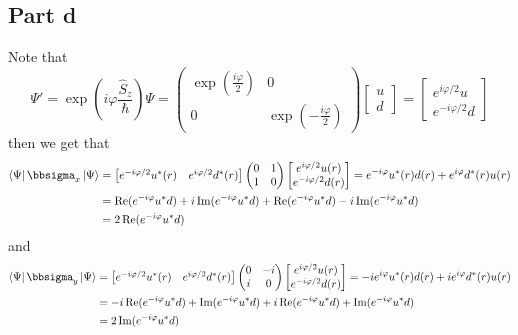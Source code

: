 \documentclass[12pt]{report}
\theoremstyle{custom}
\begin{document}
\subsection*{Part d}
Note that
\begin{equation*}
\Psi' =\exp\left(i \varphi \frac{\hat{S}_z}{\hbar}\right) \Psi =  \begin{pmatrix} \exp\left(\frac{i\varphi}{2}\right) & 0 \\ 0 & \exp\left(-\frac{i\varphi}{2}\right)\end{pmatrix} \begin{bmatrix} u \\ d\end{bmatrix} = \begin{bmatrix} e^{i\varphi/2} u \\ e^{-i\varphi/2}d \end{bmatrix} 
\end{equation*}
then we get that
\begin{align*}
  \bra{\Psi} \bbsigma_x \ket{\Psi} &= \begin{bmatrix}e^{-i\varphi/2}u^*(r) &  e^{i\varphi/2}d^*(r)\end{bmatrix} \begin{pmatrix}0 & 1 \\ 1 & 0 \end{pmatrix} \begin{bmatrix} e^{i\varphi/2}u(r) \\ e^{-i\varphi/2}d(r) \end{bmatrix} = e^{-i\varphi}u^*(r)d(r) + e^{i\varphi}d^*(r)u(r) \\
                                                                          &= \Re(e^{-i\varphi}u^*d) + i\Im(e^{-i\varphi}u^*d) + \Re(e^{-i\varphi}u^*d) - i\Im(e^{-i\varphi}u^*d) \\
                                                                      &= 2 \Re(e^{-i\varphi}u^*d)
\end{align*}
and
\begin{align*}
  \bra{\Psi} \bbsigma_y \ket{\Psi} &= \begin{bmatrix}e^{-i\varphi/2}u^*(r) &  e^{i\varphi/2}d^*(r)\end{bmatrix}\begin{pmatrix}0 & -i \\ i & 0 \end{pmatrix} \begin{bmatrix} e^{i\varphi/2}u(r) \\ e^{-i\varphi/2}d(r) \end{bmatrix} = -ie^{i\varphi}u^*(r)d(r) + i e^{i\varphi}d^*(r)u(r) \\ 
                                   &= -i\Re(e^{-i\varphi}u^*d) + \Im(e^{-i\varphi}u^*d) + i \Re(e^{-i\varphi}u^*d) + \Im(e^{-i\varphi}u^*d) \\
                                                           &= 2 \Im(e^{-i\varphi}u^*d) 
\end{align*}
\end{document}
